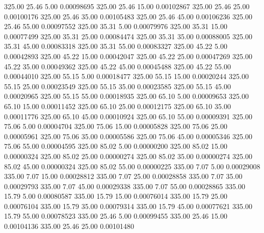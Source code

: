     325.00     25.46      5.00     0.00098695
    325.00     25.46     15.00     0.00102867
    325.00     25.46     25.00     0.00100176
    325.00     25.46     35.00     0.00105483
    325.00     25.46     45.00     0.00106236
    325.00     25.46     55.00     0.00097552
    325.00     35.31      5.00     0.00079976
    325.00     35.31     15.00     0.00077499
    325.00     35.31     25.00     0.00084474
    325.00     35.31     35.00     0.00088005
    325.00     35.31     45.00     0.00083318
    325.00     35.31     55.00     0.00083327
    325.00     45.22      5.00     0.00042893
    325.00     45.22     15.00     0.00042047
    325.00     45.22     25.00     0.00047269
    325.00     45.22     35.00     0.00049362
    325.00     45.22     45.00     0.00045488
    325.00     45.22     55.00     0.00044010
    325.00     55.15      5.00     0.00018477
    325.00     55.15     15.00     0.00020244
    325.00     55.15     25.00     0.00023549
    325.00     55.15     35.00     0.00023585
    325.00     55.15     45.00     0.00020965
    325.00     55.15     55.00     0.00018935
    325.00     65.10      5.00     0.00009653
    325.00     65.10     15.00     0.00011452
    325.00     65.10     25.00     0.00012175
    325.00     65.10     35.00     0.00011776
    325.00     65.10     45.00     0.00010924
    325.00     65.10     55.00     0.00009391
    325.00     75.06      5.00     0.00004704
    325.00     75.06     15.00     0.00005828
    325.00     75.06     25.00     0.00005961
    325.00     75.06     35.00     0.00005586
    325.00     75.06     45.00     0.00005346
    325.00     75.06     55.00     0.00004595
    325.00     85.02      5.00     0.00000200
    325.00     85.02     15.00     0.00000324
    325.00     85.02     25.00     0.00000274
    325.00     85.02     35.00     0.00000274
    325.00     85.02     45.00     0.00000324
    325.00     85.02     55.00     0.00000225
    335.00      7.07      5.00     0.00029008
    335.00      7.07     15.00     0.00028812
    335.00      7.07     25.00     0.00028858
    335.00      7.07     35.00     0.00029793
    335.00      7.07     45.00     0.00029338
    335.00      7.07     55.00     0.00028865
    335.00     15.79      5.00     0.00080587
    335.00     15.79     15.00     0.00076014
    335.00     15.79     25.00     0.00076104
    335.00     15.79     35.00     0.00079314
    335.00     15.79     45.00     0.00077621
    335.00     15.79     55.00     0.00078523
    335.00     25.46      5.00     0.00099455
    335.00     25.46     15.00     0.00104136
    335.00     25.46     25.00     0.00101480
